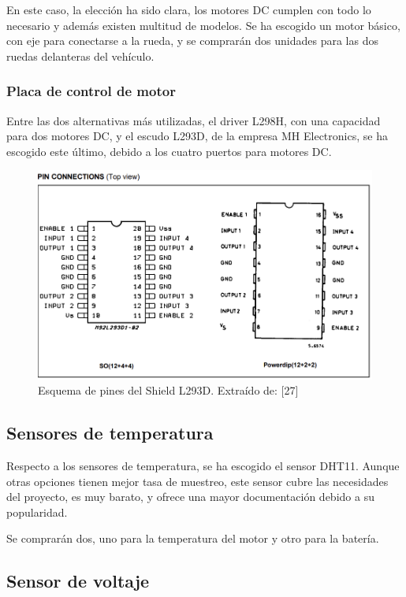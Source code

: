  En este caso, la elección ha sido clara, los motores DC cumplen con todo lo necesario y además existen multitud de modelos. 
 Se ha escogido un motor básico, con eje para conectarse a la rueda, y se comprarán dos unidades para las dos ruedas delanteras del vehículo. 

 \subsubsection*{Placa de control de motor}

 Entre las dos alternativas más utilizadas, el driver L298H, con una capacidad para dos motores DC, y el escudo L293D, de la empresa MH Electronics, se ha escogido este último, debido a los cuatro puertos para motores DC. 

 \begin{figure}[H]
  \centering
  \includegraphics[width=1\textwidth]{imagenes/pinout_L293D.png}
  \caption{Esquema de pines del Shield L293D. Extraído de: [27]}
\end{figure}

 \subsection*{Sensores de temperatura}

 Respecto a los sensores de temperatura, se ha escogido el sensor DHT11. Aunque otras opciones tienen mejor tasa de muestreo, este sensor cubre las necesidades del proyecto, es muy barato, y ofrece una mayor documentación debido a su popularidad. 

 Se comprarán dos, uno para la temperatura del motor y otro para la batería.

 \subsection*{Sensor de voltaje}

